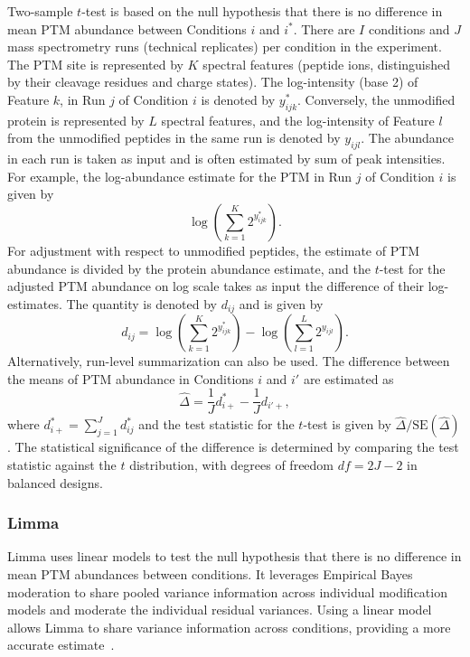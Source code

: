 \documentclass[mcp]{article}
\numberwithin{table}{section}
\begin{document}
Two-sample $t$-test is based on the null hypothesis that there is no difference in mean PTM abundance between Conditions $i$ and $i^*$. There are $I$ conditions and $J$ mass spectrometry runs (technical replicates) per condition in the experiment. The PTM site is represented by $K$ spectral features (peptide ions, distinguished by their cleavage residues and charge states). The log-intensity (base 2) of Feature $k$, in Run $j$ of Condition $i$ is denoted by $y_{ijk}^{\ast}$. Conversely, the unmodified protein is represented by $L$ spectral features, and the log-intensity of Feature $l$ from the unmodified peptides in the same run is denoted by $y_{ijl}$. The abundance in each run is taken as input and is often estimated by sum of peak intensities. For example, the log-abundance estimate for the PTM in Run $j$ of Condition $i$ is given by
\[
\log \left( \sum_{k=1}^{K} 2^{y_{ijk}^{\ast}} \right).
\]
For adjustment with respect to unmodified peptides, the estimate of PTM abundance is divided by the protein abundance estimate, 
and the $t$-test for the adjusted PTM abundance on log scale takes as input the difference of their log-estimates.
The quantity is denoted by $d_{ij}$ and is given by
\[
d_{ij} = \log \left( \sum_{k=1}^{K} 2^{y_{ijk}^{\ast}} \right) - \log \left( \sum_{l=1}^{L} 2^{y_{ijl}} \right).
\]
Alternatively, run-level summarization can also be used. The difference between the means of PTM abundance in Conditions $i$ and $i'$ are estimated as
\[
\hat{\Delta} = \frac{1}{J} d_{i+}^{\ast} - \frac{1}{J} d_{i'+},
\]
where $d_{i+}^{\ast} = \sum_{j=1}^{J} d_{ij}^{\ast}$ and the test statistic for the $t$-test is given by $\hat{\Delta} / \mathrm{SE}(\hat{\Delta})$. The statistical significance of the difference is determined by comparing the test statistic against the $t$ distribution, with degrees of freedom $df=2J-2$ in balanced designs.

\subsubsection*{Limma}

Limma uses linear models to test the null hypothesis that there is no difference in mean PTM abundances between conditions. It leverages Empirical Bayes moderation to share pooled variance information across individual modification models and moderate the individual residual variances. Using a linear model allows Limma to share variance information across conditions, providing a more accurate estimate~\cite{Ritchie_15a}.
\end{document}
